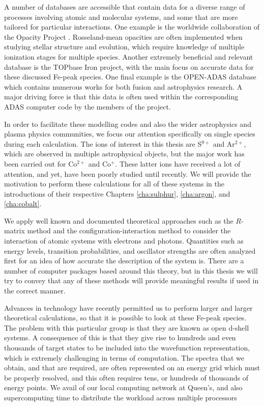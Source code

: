 A number of databases are accessible that contain data for a diverse range of processes involving atomic and molecular systems, and some that are more tailored for particular interactions. One example is the worldwide collaboration of the Opacity Project \citep{1992RMxAA..23..107C,1993A&A...275L...5C}. Rosseland-mean opacities are often implemented when studying stellar structure and evolution, which require knowledge of multiple ionization stages for multiple species. Another extremely beneficial and relevant database is the TOPbase Iron project, with the main focus on accurate data for these discussed Fe-peak species. One final example is the OPEN-ADAS database which contains numerous works for both fusion and astrophysics research. A major driving force is that this data is often used within the corresponding ADAS computer code by the members of the project.

In order to facilitate these modelling codes and also the wider astrophysics and plasma physics communities, we focus our attention specifically on single species during each calculation. The ions of interest in this thesis are S$^{9+}$ and Ar$^{2+}$, which are observed in multiple astrophysical objects, but the major work has been carried out for Co$^{2+}$ and Co$^{+}$. These latter ions have received a lot of attention, and yet, have been poorly studied until recently. We will provide the motivation to perform these calculations for all of these systems in the introductions of their respective Chapters \ref{cha:sulphur}, \ref{cha:argon}, and \ref{cha:cobalt}. 

We apply well known and documented theoretical approaches such as the $R$-matrix method and the configuration-interaction method to consider the interaction of atomic systems with electrons and photons. Quantities such as energy levels, transition probabilities, and oscillator strengths are often analyzed first for an idea of how accurate the description of the system is. There are a number of computer packages based around this theory, but in this thesis we will try to convey that any of these methods will provide meaningful results if used in the correct manner. 

Advances in technology have recently permitted us to perform larger and larger theoretical calculations, so that it is possible to look at these Fe-peak species. The problem with this particular group is that they are known as open d-shell systems. A consequence of this is that they give rise to hundreds and even thousands of target states to be included into the wavefunction representation, which is extremely challenging in terms of computation. The spectra that we obtain, and that are required, are often represented on an energy grid which must be properly resolved, and this often requires tens, or hundreds of thousands of energy points. We avail of our local computing network at Queen's, and also supercomputing time to distribute the workload across multiple processors 

